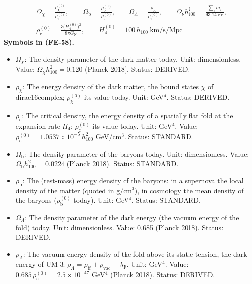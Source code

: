 \documentclass[
  10pt,
]{article}
\providecommand{\tightlist}{%
  \setlength{\itemsep}{0pt}\setlength{\parskip}{0pt}}
\begin{document}
\[
\begin{aligned}
&\Omega_\chi = \frac{\rho_\chi^{(0)}}{\rho_{\mathrm{c}}^{(0)}},\qquad \Omega_{\mathrm{b}} = \frac{\rho_{\mathrm{b}}^{(0)}}{\rho_{\mathrm{c}}^{(0)}},\qquad
 \Omega_\Lambda = \frac{\rho_\Lambda}{\rho_{\mathrm{c}}^{(0)}},\qquad \Omega_\nu h_{100}^2 = \frac{\sum_im_i}{93.14\ \text{eV}},\\
&\rho_{\mathrm{c}}^{(0)} = \frac{3\big(H_4^{(0)}\big)^2}{8\pi G_{\mathrm{N}}},\qquad H_4^{(0)} = 100\,h_{100}\ \text{km/s/Mpc}
\end{aligned} \tag{FE-58}
\] \textbf{Symbols in (FE-58).}

\begin{itemize}
\tightlist
\item
  \(\Omega_\chi\): The density parameter of the dark matter today. Unit:
  dimensionless. Value: \(\Omega_\chi h_{100}^2 = 0.120\) (Planck 2018).
  Status: DERIVED.
\item
  \(\rho_\chi\): The energy density of the dark matter, the bound states
  \(\chi\) of dirac16complex; \(\rho_\chi^{(0)}\) its value today. Unit:
  GeV\(^4\). Status: DERIVED.
\item
  \(\rho_{\mathrm{c}}\): The critical density, the energy density of a
  spatially flat fold at the expansion rate \(H_4\);
  \(\rho_{\mathrm{c}}^{(0)}\) its value today. Unit: GeV\(^4\). Value:
  \(\rho_{\mathrm{c}}^{(0)} = 1.0537\times10^{-5}\,h_{100}^2\)
  GeV/cm\(^3\). Status: STANDARD.
\item
  \(\Omega_{\mathrm{b}}\): The density parameter of the baryons today.
  Unit: dimensionless. Value: \(\Omega_{\mathrm{b}}h_{100}^2 = 0.0224\)
  (Planck 2018). Status: STANDARD.
\item
  \(\rho_{\mathrm{b}}\): The (rest-mass) energy density of the baryons:
  in a supernova the local density of the matter (quoted in g/cm\(^3\)),
  in cosmology the mean density of the baryons
  (\(\rho_{\mathrm{b}}^{(0)}\) today). Unit: GeV\(^4\). Status:
  STANDARD.
\item
  \(\Omega_\Lambda\): The density parameter of the dark energy (the
  vacuum energy of the fold) today. Unit: dimensionless. Value: 0.685
  (Planck 2018). Status: DERIVED.
\item
  \(\rho_\Lambda\): The vacuum energy density of the fold above its
  static tension, the dark energy of UM-3:
  \(\rho_\Lambda = \rho_{\mathrm{ff}} + \rho_{\mathrm{vac}} - \lambda_{\mathrm{F}}\).
  Unit: GeV\(^4\). Value:
  \(0.685\,\rho_{\mathrm{c}}^{(0)} = 2.5\times10^{-47}\) GeV\(^4\)
  (Planck 2018). Status: DERIVED.

\end{itemize}
\end{document}
